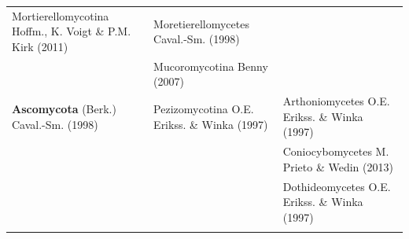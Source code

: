\documentclass[]{book}
\begin{document}
\begin{longtable}[]{@{}lll@{}}
\begin{minipage}[t]{0.28\columnwidth}
Mortierellomycotina Hoffm., K. Voigt \& P.M. Kirk (2011)\strut
\end{minipage} & \begin{minipage}[t]{0.31\columnwidth}\raggedright\strut
Moretierellomycetes Caval.-Sm. (1998)\strut
\end{minipage}\tabularnewline
\begin{minipage}[t]{0.32\columnwidth}\raggedright\strut
\strut
\end{minipage} & \begin{minipage}[t]{0.28\columnwidth}\raggedright\strut
Mucoromycotina Benny (2007)\strut
\end{minipage} & \begin{minipage}[t]{0.31\columnwidth}\raggedright\strut
\strut
\end{minipage}\tabularnewline
\begin{minipage}[t]{0.32\columnwidth}\raggedright\strut
\textbf{Ascomycota} (Berk.) Caval.-Sm. (1998)\strut
\end{minipage} & \begin{minipage}[t]{0.28\columnwidth}\raggedright\strut
Pezizomycotina O.E. Erikss. \& Winka (1997)\strut
\end{minipage} & \begin{minipage}[t]{0.31\columnwidth}\raggedright\strut
Arthoniomycetes O.E. Erikss. \& Winka (1997)\strut
\end{minipage}\tabularnewline
\begin{minipage}[t]{0.32\columnwidth}\raggedright\strut
\strut
\end{minipage} & \begin{minipage}[t]{0.28\columnwidth}\raggedright\strut
\strut
\end{minipage} & \begin{minipage}[t]{0.31\columnwidth}\raggedright\strut
Coniocybomycetes M. Prieto \& Wedin (2013)\strut
\end{minipage}\tabularnewline
\begin{minipage}[t]{0.32\columnwidth}\raggedright\strut
\strut
\end{minipage} & \begin{minipage}[t]{0.28\columnwidth}\raggedright\strut
\strut
\end{minipage} & \begin{minipage}[t]{0.31\columnwidth}\raggedright\strut
Dothideomycetes O.E. Erikss. \& Winka (1997)\strut
\end{minipage}\tabularnewline
\begin{minipage}[t]{0.32\columnwidth}\raggedright\strut

\end{minipage}
\end{longtable}
\end{document}
